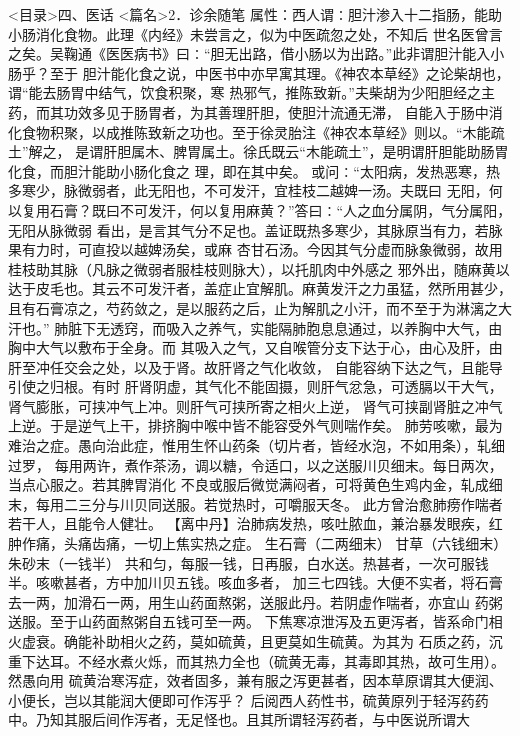 \documentclass[a4paper,12pt,UTF8,twoside]{ctexbook}
\begin{document}
<目录>四、医话
<篇名>2．诊余随笔
属性：西人谓∶胆汁渗入十二指肠，能助小肠消化食物。此理《内经》未尝言之，似为中医疏忽之处，不知后 
世名医曾言之矣。吴鞠通《医医病书》曰∶“胆无出路，借小肠以为出路。”此非谓胆汁能入小肠乎？至于 
胆汁能化食之说，中医书中亦早寓其理。《神农本草经》之论柴胡也，谓“能去肠胃中结气，饮食积聚，寒 
热邪气，推陈致新。”夫柴胡为少阳胆经之主药，而其功效多见于肠胃者，为其善理肝胆，使胆汁流通无滞， 
自能入于肠中消化食物积聚，以成推陈致新之功也。至于徐灵胎注《神农本草经》则以。“木能疏土”解之， 
是谓肝胆属木、脾胃属土。徐氏既云“木能疏土”，是明谓肝胆能助肠胃化食，而胆汁能助小肠化食之 
理，即在其中矣。 
或问∶“太阳病，发热恶寒，热多寒少，脉微弱者，此无阳也，不可发汗，宜桂枝二越婢一汤。夫既曰 
无阳，何以复用石膏？既曰不可发汗，何以复用麻黄？”答曰∶“人之血分属阴，气分属阳，无阳从脉微弱 
看出，是言其气分不足也。盖证既热多寒少，其脉原当有力，若脉果有力时，可直投以越婢汤矣，或麻 
杏甘石汤。今因其气分虚而脉象微弱，故用桂枝助其脉（凡脉之微弱者服桂枝则脉大），以托肌肉中外感之 
邪外出，随麻黄以达于皮毛也。其云不可发汗者，盖症止宜解肌。麻黄发汗之力虽猛，然所用甚少， 
且有石膏凉之，芍药敛之，是以服药之后，止为解肌之小汗，而不至于为淋漓之大汗也。” 
肺脏下无透窍，而吸入之养气，实能隔肺胞息息通过，以养胸中大气，由胸中大气以敷布于全身。而 
其吸入之气，又自喉管分支下达于心，由心及肝，由肝至冲任交会之处，以及于肾。故肝肾之气化收敛， 
自能容纳下达之气，且能导引使之归根。有时 
肝肾阴虚，其气化不能固摄，则肝气忿急，可透膈以干大气，肾气膨胀，可挟冲气上冲。则肝气可挟所寄之相火上逆， 
肾气可挟副肾脏之冲气上逆。于是逆气上干，排挤胸中喉中皆不能容受外气则喘作矣。 
肺劳咳嗽，最为难治之症。愚向治此症，惟用生怀山药条（切片者，皆经水泡，不如用条），轧细过罗， 
每用两许，煮作茶汤，调以糖，令适口，以之送服川贝细末。每日两次，当点心服之。若其脾胃消化 
不良或服后微觉满闷者，可将黄色生鸡内金，轧成细末，每用二三分与川贝同送服。若觉热时，可嚼服天冬。 
此方曾治愈肺痨作喘者若干人，且能令人健壮。 
【离中丹】治肺病发热，咳吐脓血，兼治暴发眼疾，红肿作痛，头痛齿痛，一切上焦实热之症。 
生石膏（二两细末） 甘草（六钱细末） 朱砂末（一钱半） 
共和匀，每服一钱，日再服，白水送。热甚者，一次可服钱半。咳嗽甚者，方中加川贝五钱。咳血多者， 
加三七四钱。大便不实者，将石膏去一两，加滑石一两，用生山药面熬粥，送服此丹。若阴虚作喘者，亦宜山 
药粥送服。至于山药面熬粥自五钱可至一两。 
下焦寒凉泄泻及五更泻者，皆系命门相火虚衰。确能补助相火之药，莫如硫黄，且更莫如生硫黄。为其为 
石质之药，沉重下达耳。不经水煮火烁，而其热力全也（硫黄无毒，其毒即其热，故可生用）。然愚向用 
硫黄治寒泻症，效者固多，兼有服之泻更甚者，因本草原谓其大便润、小便长，岂以其能润大便即可作泻乎？ 
后阅西人药性书，硫黄原列于轻泻药药中。乃知其服后间作泻者，无足怪也。且其所谓轻泻药者，与中医说所谓大 
\end{document}
